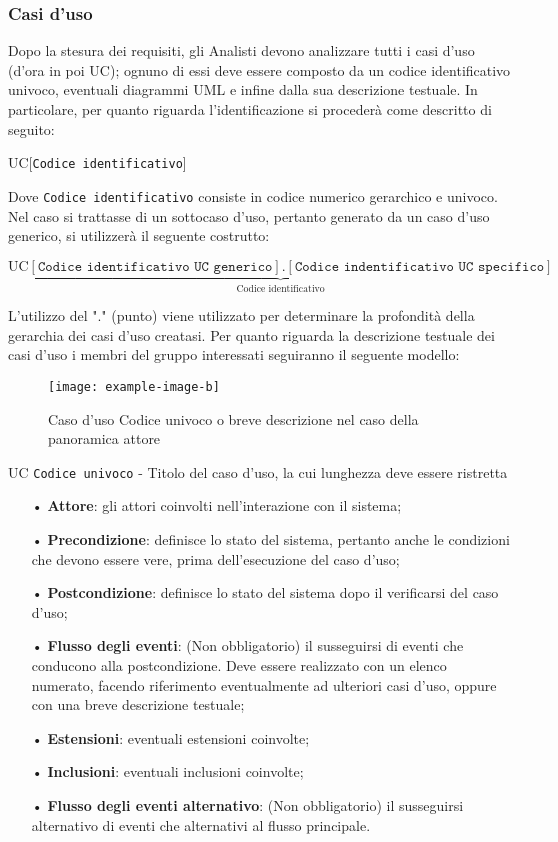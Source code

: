 \subsubsection{Casi d'uso}
Dopo la stesura dei requisiti, gli Analisti devono analizzare tutti i casi d'uso (d'ora in poi UC); ognuno di essi deve essere composto da un codice identificativo univoco, eventuali diagrammi UML e infine dalla sua descrizione testuale. In particolare, per quanto riguarda l'identificazione si procederà come descritto di seguito:
\begin{center}
UC[\texttt{Codice identificativo}]
\end{center}
Dove \texttt{Codice identificativo} consiste in codice numerico {gerarchico} e univoco.
Nel caso si trattasse di un {sottocaso d'uso}, pertanto generato da un caso d'uso generico, si utilizzerà il seguente costrutto:
\begin{center}
$\text{UC}\underbrace{[\texttt{Codice identificativo UC generico}].[\texttt{Codice indentificativo UC specifico}]}_{\text{Codice   identificativo}}$
\end{center}
L'utilizzo del "." (punto) viene utilizzato per determinare la profondità della gerarchia dei casi d'uso creatasi.
Per quanto riguarda la descrizione testuale dei casi d'uso i membri del gruppo interessati seguiranno il seguente modello:
\begin{figure}[H]
\centering
\texttt{[image: example-image-b]}
\caption{Caso d'uso Codice univoco o breve descrizione nel caso della panoramica attore}
\end{figure}
UC \texttt{Codice univoco} - Titolo del caso d'uso, la cui lunghezza deve essere ristretta
\begin{itemize}
\item[•] \textbf{Attore}: gli attori coinvolti nell'interazione con il sistema;
\item[•] \textbf{Precondizione}: definisce lo stato del sistema, pertanto anche le condizioni che devono essere vere, prima dell'esecuzione del caso d'uso;
\item[•] \textbf{Postcondizione}: definisce lo stato del sistema dopo il verificarsi del caso d'uso; 
\item[•] \textbf{Flusso degli eventi}: (Non obbligatorio) il susseguirsi di eventi che conducono alla postcondizione. Deve essere realizzato con un elenco numerato, facendo riferimento eventualmente ad ulteriori casi d'uso, oppure con una breve descrizione testuale;
\item[•] \textbf{Estensioni}: eventuali estensioni coinvolte;
\item[•] \textbf{Inclusioni}: eventuali inclusioni coinvolte;
\item[•] \textbf{Flusso degli eventi alternativo}: (Non obbligatorio) il susseguirsi alternativo di eventi che alternativi al flusso principale. 
\end{itemize}



